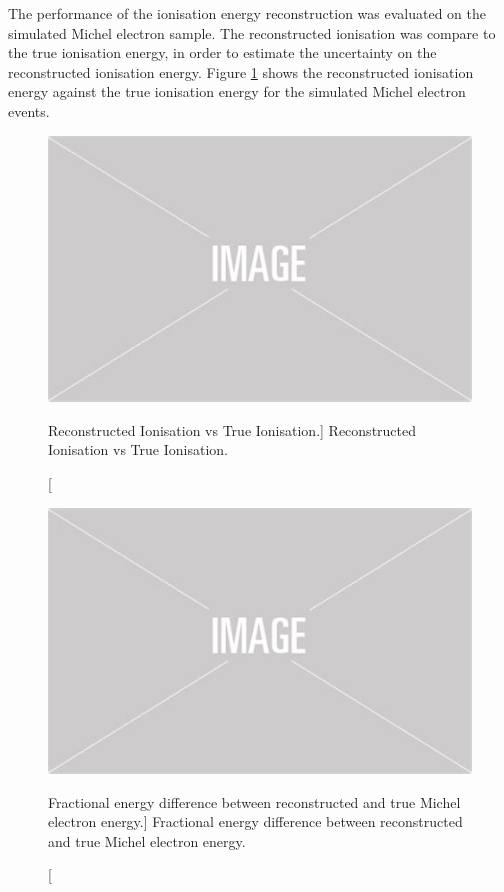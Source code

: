 The performance of the ionisation energy reconstruction was evaluated on the
simulated Michel electron sample. The reconstructed ionisation was compare to
the true ionisation energy, in order to estimate the uncertainty on the
reconstructed ionisation energy. Figure \ref{fig:reco_v_ion} shows the
reconstructed ionisation energy against the true ionisation energy for the
simulated Michel electron events. 
\begin{figure}
	\centering
	\includegraphics[width=\textwidth]{figures/placeholder.png}
	\caption
	[Reconstructed Ionisation vs True Ionisation.]
	{Reconstructed Ionisation vs True Ionisation.}
	\label{fig:reco_v_ion}
\end{figure}


\begin{figure}
	\centering
	\includegraphics[width=\textwidth]{figures/placeholder.png}
	\caption
	[Fractional energy difference between reconstructed and true Michel electron
	energy.]
	{Fractional energy difference between reconstructed and true Michel electron
	energy.}
	\label{fig:frac_diff_ion}
\end{figure}

